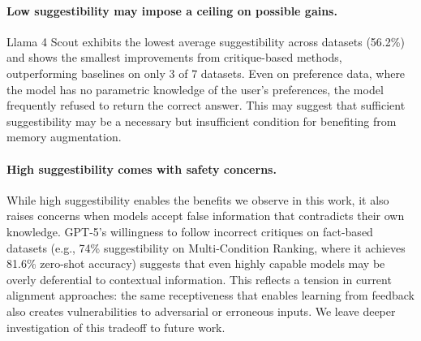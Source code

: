 \paragraph{Low suggestibility may impose a ceiling on possible gains.}
Llama 4 Scout exhibits the lowest average suggestibility across datasets (56.2\%) and shows the smallest improvements from critique-based methods, outperforming baselines on only 3 of 7 datasets. Even on preference data, where the model has no parametric knowledge of the user's preferences, the model frequently refused to return the correct answer. This may suggest that sufficient suggestibility may be a necessary but insufficient condition for benefiting from memory augmentation.

\paragraph{High suggestibility comes with safety concerns.}
While high suggestibility enables the benefits we observe in this work, it also raises concerns when models accept false information that contradicts their own knowledge. GPT-5's willingness to follow incorrect critiques on fact-based datasets (e.g., 74\% suggestibility on Multi-Condition Ranking, where it achieves 81.6\% zero-shot accuracy) suggests that even highly capable models may be overly deferential to contextual information. This reflects a tension in current alignment approaches: the same receptiveness that enables learning from feedback also creates vulnerabilities to adversarial or erroneous inputs. We leave deeper investigation of this tradeoff to future work.